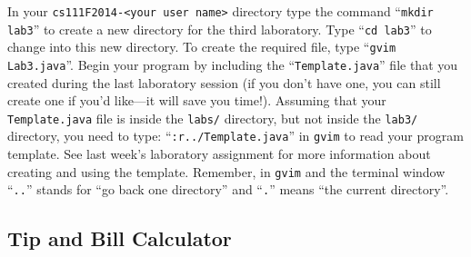 In your {\tt cs111F2014-<your user name>} directory type the command ``{\tt mkdir lab3}'' to create a new directory for
the third laboratory.  \noindent Type ``{\tt cd lab3}'' to change into this new directory.  To create the required file,
type ``{\tt gvim Lab3.java}''. Begin your program by including the ``{\tt Template.java}'' file that you created during
the last laboratory session (if you don't have one, you can still create one if you'd like---it will save you time!).
Assuming that your {\tt Template.java} file is inside the {\tt labs/} directory, but not inside the {\tt lab3/}
directory, you need to type: ``{\tt :r../Template.java}'' in {\tt gvim} to read your program template.  See last week's
laboratory assignment for more information about creating and using the template. Remember, in {\tt gvim} and the
terminal window ``{\tt ..}'' stands for ``go back one directory'' and ``{\tt .}'' means ``the current directory''.

\vspace{-0.15in}
\subsection*{Tip and Bill Calculator}

